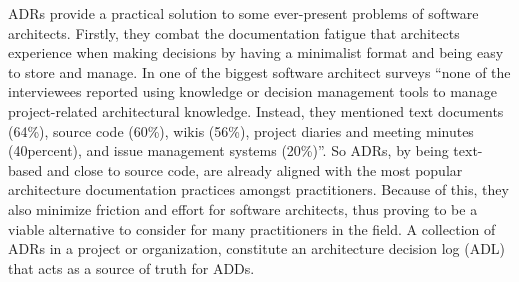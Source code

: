         ADRs provide a practical solution to some ever-present problems of software architects. Firstly, they combat the documentation fatigue that architects experience when making decisions by having a minimalist format and being easy to store and manage. In one of the biggest software architect surveys \cite{architect_survey2} ``none of the interviewees reported using knowledge or decision management tools to manage project-related architectural knowledge. Instead, they mentioned text documents (64\%), source code (60\%), wikis (56\%), project diaries and meeting minutes (40percent), and issue management systems (20\%)''. So ADRs, by being text-based and close to source code, are already aligned with the most popular architecture documentation practices amongst practitioners. Because of this, they also minimize friction and effort for software architects, thus proving to be a viable alternative to consider for many practitioners in the field. A collection of ADRs in a project or organization, constitute an architecture decision log (ADL) that acts as a source of truth for ADDs.
        
